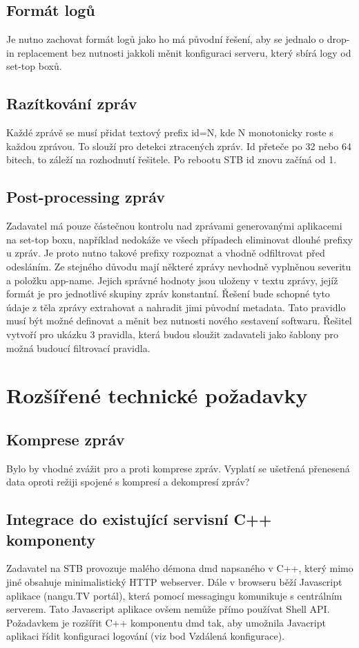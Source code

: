 \documentclass[thesis=B,czech]{FITthesis}[2012/06/26]
\begin{document}
\subsection{Formát logů}
Je nutno zachovat formát logů jako ho má původní řešení, aby se jednalo o drop-in replacement bez nutnosti jakkoli měnit konfiguraci serveru, který sbírá logy od set-top boxů.

\subsection{Razítkování zpráv}
Každé zprávě se musí přidat textový prefix id=N, kde N monotonicky roste s každou zprávou.  To slouží pro detekci ztracených zpráv. Id přeteče po 32 nebo 64 bitech, to záleží na rozhodnutí řešitele. Po rebootu STB id znovu začíná od 1.

\subsection{Post-processing zpráv}
Zadavatel má pouze částečnou kontrolu nad zprávami generovanými aplikacemi na set-top boxu, například nedokáže ve všech případech eliminovat dlouhé prefixy u zpráv. Je proto nutno takové prefixy rozpoznat a vhodně odfiltrovat před odesláním. Ze stejného důvodu mají některé zprávy nevhodně vyplněnou severitu a položku app-name. Jejich správné hodnoty jsou uloženy v textu zprávy, jejíž formát je pro jednotlivé skupiny zpráv konstantní. Řešení bude schopné tyto údaje z těla zprávy extrahovat a nahradit jimi původní metadata. Tato pravidlo musí být možné definovat a měnit bez nutnosti nového sestavení softwaru. 
Řešitel vytvoří pro ukázku 3 pravidla, která budou sloužit zadavateli jako šablony pro možná budoucí filtrovací pravidla.

\section{Rozšířené technické požadavky}

\subsection{Komprese zpráv}
Bylo by vhodné zvážit pro a proti komprese zpráv. Vyplatí se ušetřená přenesená data oproti režiji spojené s kompresí a dekompresí zpráv?

\subsection{Integrace do existující servisní C++ komponenty}
Zadavatel na STB provozuje malého démona dmd napsaného v C++, který mimo jiné obsahuje minimalistický HTTP webserver. Dále v browseru běží Javascript aplikace (nangu.TV portál), která pomocí messagingu komunikuje s centrálním serverem. Tato Javascript aplikace ovšem nemůže přímo používat Shell API.
Požadavkem je rozšířit C++ komponentu dmd tak, aby umožnila Javacript aplikaci řídit konfiguraci logování (viz bod Vzdálená konfigurace).
\end{document}
